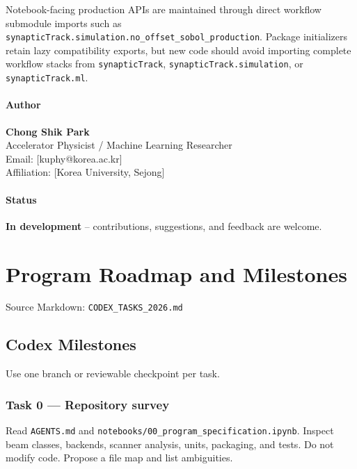 \documentclass[
]{article}
\begin{document}
Notebook-facing production APIs are maintained through direct workflow
submodule imports such as
\texttt{synapticTrack.simulation.no\_offset\_sobol\_production}. Package
initializers retain lazy compatibility exports, but new code should
avoid importing complete workflow stacks from \texttt{synapticTrack},
\texttt{synapticTrack.simulation}, or \texttt{synapticTrack.ml}.

\hypertarget{author}{%
\paragraph{Author}\label{author}}

\textbf{Chong Shik Park}\\
Accelerator Physicist / Machine Learning Researcher\\
Email: {[}kuphy@korea.ac.kr{]}\\
Affiliation: {[}Korea University, Sejong{]}

\hypertarget{status}{%
\paragraph{Status}\label{status}}

\textbf{In development} -- contributions, suggestions, and feedback are
welcome.

\hypertarget{program-roadmap-and-milestones}{%
\section{Program Roadmap and
Milestones}\label{program-roadmap-and-milestones}}

Source Markdown: \texttt{CODEX\_TASKS\_2026.md}

\hypertarget{codex-milestones}{%
\subsection{Codex Milestones}\label{codex-milestones}}

Use one branch or reviewable checkpoint per task.

\hypertarget{task-0-repository-survey}{%
\subsubsection{Task 0 --- Repository
survey}\label{task-0-repository-survey}}

Read \texttt{AGENTS.md} and
\texttt{notebooks/00\_program\_specification.ipynb}. Inspect beam
classes, backends, scanner analysis, units, packaging, and tests. Do not
modify code. Propose a file map and list ambiguities.
\end{document}
